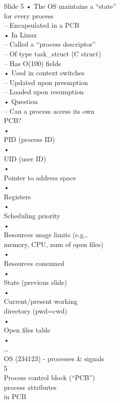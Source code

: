 \documentclass{beamer}
\begin{document}
\begin{frame}{Slide 5}
• The OS maintains a “state” \\for every process\\– Encapsulated in a  PCB\\• In Linux\\– Called a “process descriptor”\\– Of type task\_struct (C struct)\\– Has O(100) fields\\• Used in context switches\\– Updated upon preemption\\– Loaded upon resumption\\• Question\\– Can a process access its own \\PCB?\\•\\PID (process ID)\\•\\UID (user ID)\\•\\Pointer to address space\\•\\Registers\\•\\Scheduling priority\\•\\Resources usage limits (e.g., \\memory, CPU, num of open files)\\•\\Resources consumed\\•\\State (previous slide)\\•\\Current/present working \\directory (pwd=cwd)\\•\\Open files table\\•\\…\\OS (234123) - processes \& signals\\5\\Process control block (“PCB”)\\process attributes \\in PCB
\end{frame}
\end{document}
